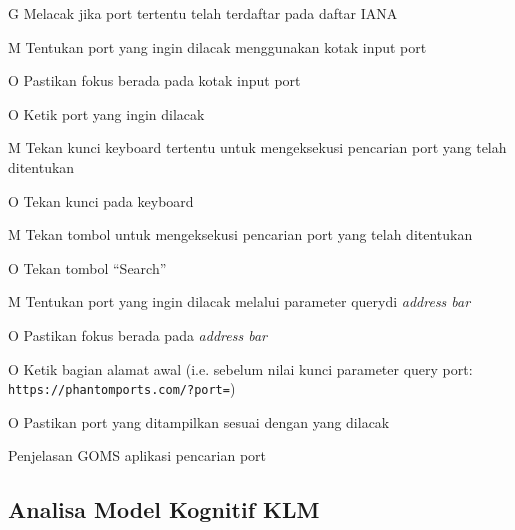 \begin{chtbl}
  \begin{gomstbl}
    G{
      Melacak jika port tertentu telah terdaftar pada daftar IANA
    }

    M{
      Tentukan port yang ingin dilacak menggunakan kotak input port
    }

    O{
      Pastikan fokus berada pada kotak input port
    }

    O{
      Ketik port yang ingin dilacak
    }

    M{
      Tekan kunci keyboard tertentu untuk mengeksekusi pencarian port
      yang telah ditentukan
    }

    O{
      Tekan kunci \Enter pada keyboard
    }

    M{
      Tekan tombol untuk mengeksekusi pencarian port yang telah ditentukan
    }

    O{
      Tekan tombol ``Search''
    }

    M{
      Tentukan port yang ingin dilacak melalui parameter
      query\footnotemark di \textit{address bar}\footnotemark
    }

    O{
      Pastikan fokus berada pada \textit{address bar}
    }

    O{
      Ketik bagian alamat awal (i.e. sebelum nilai kunci parameter
      query port: \texttt{https://phantomports.com/?port=})
    }

    O{
      Pastikan port yang ditampilkan sesuai dengan yang dilacak
    }
  \end{gomstbl}
  \caption{Penjelasan GOMS aplikasi pencarian port}
\end{chtbl}


\subsection{Analisa Model Kognitif KLM}

